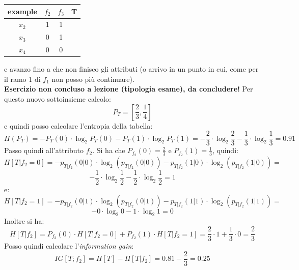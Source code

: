 \documentclass[a4paper,12pt, oneside]{book}
\begin{document}
\begin{esercizio}
  \begin{table}[H]
    \centering
    \begin{tabular}{c|c|c|c}
      example  & $f_2$ & $f_3$ & T\\
      \hline
      $x_2$ & 1 & 1 & \color{red}{0}\\
      $x_3$ & 0 & 1 & \color{darkgreen}{1}\\
      $x_4$ & 0 & 0 & \color{red}{0}\\
    \end{tabular}
  \end{table}
  e avanzo fino a che non finisco gli attributi (o arrivo in un punto in cui,
  come per il ramo 1 di $f_1$ non posso più continuare).\\
  \textbf{Esercizio non concluso a lezione (tipologia esame), da concludere!}
  Per questo nuovo sottoinsieme calcolo:
  \[P_T=\left[\frac{2}{3},\frac{1}{4}\right]\]
  e quindi posso calcolare l'entropia della tabella:
  \[H(P_T)=-P_T(0)\cdot \log_2 P_T(0)-P_T(1)\cdot\log_2
    P_T(1)=-\frac{2}{3}\cdot\log_2\frac{2}{3}-\frac{1}{3}\cdot\log_2
    \frac{1}{3}= 0.91\]
  Passo quindi all'attributo $f_2$. Si ha che $P_{f_2}(0)=\frac{2}{3}$ e
  $P_{f_2}(1)=\frac{1}{3}$, quindi:
  \[H[T|f_2=0]=-p_{T|f_2}(0|0)\cdot \log_2(p_{T|f_2}(0|0))-p_{T|f_2}(1|0)\cdot
    \log_2(p_{T|f_2}(1|0))=\]
  \[-\frac{1}{2}\cdot \log_2 \frac{1}{2}-\frac{1}{2}\cdot \log_2 \frac{1}{2}=1\]
  e:
  \[H[T|f_2=1]=-p_{T|f_2}(0|1)\cdot \log_2(p_{T|f_2}(0|1))-p_{T|f_2}(1|1)\cdot
    \log_2(p_{T|f_2}(1|1))=\]
  \[-0\cdot \log_2 0-1\cdot \log_2 1=0\]
  Inoltre si ha:
  \[H[T|f_2]=P_{f_2}(0)\cdot H[T|f_2=0]+P_{f_2}(1)\cdot
    H[T|f_2=1]=\frac{2}{3}\cdot 1+\frac{1}{3}\cdot 0=\frac{2}{3}\]
  Posso quindi calcolare l'\textit{information gain}:
  \[IG[T;f_2]=H[T]-H[T|f_2]=0.81-\frac{2}{3}=0.25\]
  

\end{esercizio}
\end{document}
